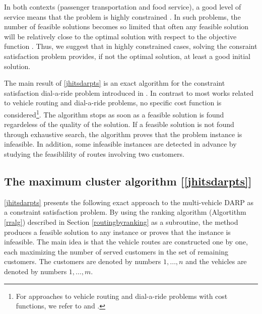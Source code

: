 \documentclass[dissertation,draft*]{aaltoseries}
\begin{document}
In both contexts (passenger transportation and food service), a good level of service means that the problem is highly constrained \cite{jokinen-fists-2011}. 
In such problems, the number of feasible solutions becomes so limited that often
any feasible solution will be relatively close to the optimal solution with respect to the
objective function \cite{psaraftis02}.
Thus, we suggest that in highly constrained cases, solving the consraint satisfaction problem provides, 
if not the optimal solution, at least a good initial solution. 

The main result of \ref{jhitsdarpts} is an exact algorithm for the constraint satisfaction dial-a-ride problem
introduced in \cite{berbegliafeas}. In contrast to most works related to vehicle routing and dial-a-ride problems,
no specific cost function is considered\footnote{
For approaches to vehicle routing and dial-a-ride problems with cost functions, 
we refer to \cite{braysy01,braysy02,groer} and \cite{cordeau02,berbegliahybrid}.}. 
The algorithm stops as soon as a feasible solution is found regardeless of
the quality of the solution. If a feasible solution is not found through exhaustive search, the algorithm 
proves that the problem instance is infeasible. In addition, some infeasible instances are detected in advance
by studying the feasiblility of routes involving two customers. 



\subsection{The maximum cluster algorithm [\ref{jhitsdarpts}]}
\label{mvsolution}
\ref{jhitsdarpts} presents the following exact approach to the multi-vehicle DARP as a constraint satisfaction problem.
By using the ranking algorithm (Algortithm \ref{rralg}) described in Section \ref{routingbyranking} as a subroutine,
 the method produces a feasible solution to 
any instance or proves that the instance is infeasible. The main idea is that the vehicle routes are constructed
one by one, each maximizing the number of served customers in the set of remaining customers.
The customers are denoted by numbers $1,\ldots,n$ and the vehicles are denoted by numbers $1,\ldots,m$.
\end{document}
